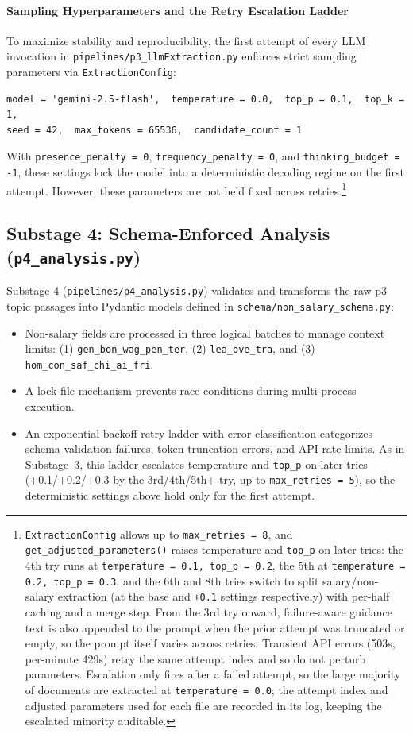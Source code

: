 \paragraph{Sampling Hyperparameters and the Retry Escalation Ladder}
To maximize stability and reproducibility, the first attempt of every LLM invocation in \nolinkurl{pipelines/p3_llmExtraction.py} enforces strict sampling parameters via \texttt{ExtractionConfig}:
\begin{verbatim}
model = 'gemini-2.5-flash',  temperature = 0.0,  top_p = 0.1,  top_k = 1,
seed = 42,  max_tokens = 65536,  candidate_count = 1
\end{verbatim}
With \texttt{presence\_penalty = 0}, \texttt{frequency\_penalty = 0}, and \texttt{thinking\_budget = -1}, these settings lock the model into a deterministic decoding regime on the first attempt. However, these parameters are not held fixed across retries.\footnote{\texttt{ExtractionConfig} allows up to \texttt{max\_retries = 8}, and \texttt{get\_adjusted\_parameters()} raises temperature and \texttt{top\_p} on later tries: the 4th try runs at \texttt{temperature = 0.1, top\_p = 0.2}, the 5th at \texttt{temperature = 0.2, top\_p = 0.3}, and the 6th and 8th tries switch to split salary/non-salary extraction (at the base and \texttt{+0.1} settings respectively) with per-half caching and a merge step. From the 3rd try onward, failure-aware guidance text is also appended to the prompt when the prior attempt was truncated or empty, so the prompt itself varies across retries. Transient API errors (503s, per-minute 429s) retry the same attempt index and so do not perturb parameters. Escalation only fires after a failed attempt, so the large majority of documents are extracted at \texttt{temperature = 0.0}; the attempt index and adjusted parameters used for each file are recorded in its log, keeping the escalated minority auditable.}

\subsection{Substage 4: Schema-Enforced Analysis (\texttt{p4\_analysis.py})}
\label{subsec:p4}

Substage 4 (\nolinkurl{pipelines/p4_analysis.py}) validates and transforms the raw p3 topic passages into Pydantic models defined in \nolinkurl{schema/non_salary_schema.py}:
\begin{itemize}[leftmargin=1.5em]
  \item Non-salary fields are processed in three logical batches to manage context limits: (1) \texttt{gen\_bon\_wag\_pen\_ter}, (2) \texttt{lea\_ove\_tra}, and (3) \texttt{hom\_con\_saf\_chi\_ai\_fri}.
  \item A lock-file mechanism prevents race conditions during multi-process execution.
  \item An exponential backoff retry ladder with error classification categorizes schema validation failures, token truncation errors, and API rate limits. As in Substage~3, this ladder escalates temperature and \texttt{top\_p} on later tries (+0.1/+0.2/+0.3 by the 3rd/4th/5th+ try, up to \texttt{max\_retries = 5}), so the deterministic settings above hold only for the first attempt.
\end{itemize}

